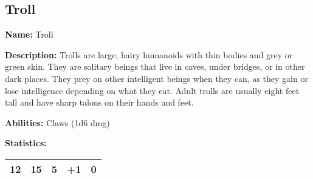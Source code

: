 \begin{multicols}{2}
\subsection{Troll}

\textbf{Name:} Troll

\textbf{Description:} Trolls are large, hairy humanoids with thin bodies and grey or green skin.
They are solitary beings that live in caves, under bridges, or in other dark places. They prey
on other intelligent beings when they can, as they gain or lose intelligence depending on what
they eat. Adult trolls are usually eight feet tall and have sharp talons on their hands and feet.

\textbf{Abilities:} Claws (1d6 dmg)

\textbf{Statistics:}

\begin{center}
{
\begin{xtabular}{|l|l|l|l|l|}
12 & 15 & 5 & +1 & 0 \\
\hline
\end{xtabular}
}
\end{center}

\end{multicols}
